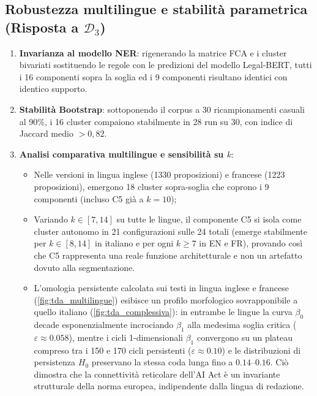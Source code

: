\documentclass[12pt,a4paper,oneside]{report}
\begin{document}
\subsection{Robustezza multilingue e stabilità parametrica (Risposta a \texorpdfstring{$\mathcal{D}_3$}{D3})}
\begin{enumerate}
    \item \textbf{Invarianza al modello NER}: rigenerando la matrice FCA e i cluster bivariati sostituendo le regole con le predizioni del modello Legal-BERT, tutti i 16 componenti sopra la soglia ed i 9 componenti risultano identici con identico supporto.
    \item \textbf{Stabilità Bootstrap}: sottoponendo il corpus a 30 ricampionamenti casuali al 90\%, i 16 cluster compaiono stabilmente in 28 run su 30, con indice di Jaccard medio $> 0,82$.
    \item \textbf{Analisi comparativa multilingue e sensibilità su $k$}:
    \begin{itemize}
        \item Nelle versioni in lingua inglese (\num{1330} proposizioni) e francese (\num{1223} proposizioni), emergono 18 cluster sopra-soglia che coprono i 9 componenti (incluso C5 già a $k=10$);
        \item Variando $k \in [7, 14]$ su tutte le lingue, il componente C5 si isola come cluster autonomo in 21 configurazioni sulle 24 totali (emerge stabilmente per $k \in [8, 14]$ in italiano e per ogni $k \ge 7$ in EN e FR), provando così che C5 rappresenta una reale funzione architetturale e non un artefatto dovuto alla segmentazione.
        \item L'omologia persistente calcolata sui testi in lingua inglese e francese (\cref{fig:tda_multilingue}) esibisce un profilo morfologico sovrapponibile a quello italiano (\cref{fig:tda_complessiva}): in entrambe le lingue la curva $\beta_0$ decade esponenzialmente incrociando $\beta_1$ alla medesima soglia critica ($\varepsilon \approx \num{0,058}$), mentre i cicli 1-dimensionali $\beta_1$ convergono su un plateau compreso tra i 150 e 170 cicli persistenti ($\varepsilon \approx \num{0,10}$) e le distribuzioni di persistenza $H_0$ preservano la stessa coda lunga fino a $\num{0,14}\text{--}\num{0,16}$. Ciò dimostra che la connettività reticolare dell'AI Act è un invariante strutturale della norma europea, indipendente dalla lingua di redazione.
    \end{itemize}
\end{enumerate}
%
\end{document}

